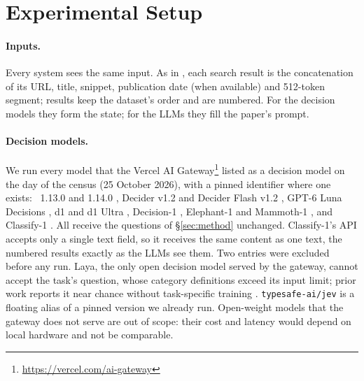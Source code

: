 \section{Experimental Setup}
\label{sec:setup}

\paragraph{Inputs.} Every system sees the same input. As in \citet{cattan2025dragged}, each search result is the
concatenation of its URL, title, snippet, publication date (when available) and 512-token segment; results keep the
dataset's order and are numbered. For the decision models they form the state; for the LLMs they fill the paper's
prompt.

\paragraph{Decision models.} We run every model that the Vercel AI Gateway\footnote{\url{https://vercel.com/ai-gateway}} listed as a
decision model on the day of the census (25 October 2026),
with a pinned identifier where one exists: \jev~1.13.0 and 1.14.0 \citep{typesafe2026jev}, Decider v1.2 and Decider Flash v1.2
\citep{perplexity2026decider,perplexity2026deciderflash}, GPT-6 Luna Decisions \citep{openai2026decisions}, d1 and d1
Ultra \citep{liquid2026d1,liquid2026d1ultra}, Decision-1 \citep{microsoft2026decision}, Elephant-1 and Mammoth-1
\citep{baseten2026decision}, and Classify-1 \citep{scaledown2026classify}. All receive the questions of \S\ref{sec:method} unchanged.
Classify-1's API accepts only a single text field, so it receives the same content as one text, the numbered
results exactly as the LLMs see them. Two entries were excluded before any run. Laya, the only open decision model
served by the gateway, cannot accept the task's question, whose category definitions exceed its input limit; prior
work reports it near chance without task-specific training \citep{duan2026general,nandakishore2026laya}.
\texttt{typesafe-ai/jev} is a floating alias of a pinned version we already run. Open-weight models that the gateway
does not serve are out of scope: their cost and latency would depend on local hardware and not be comparable.

